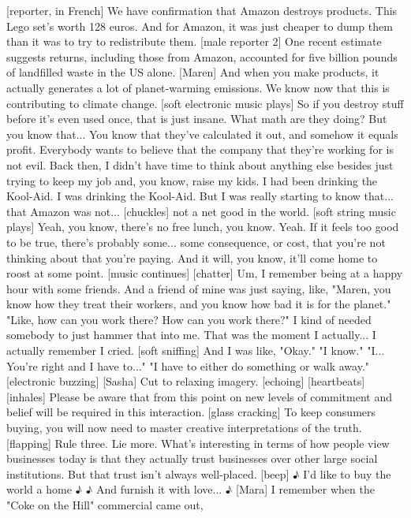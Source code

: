 \documentclass[a4paper]{article}
\begin{document}
	[reporter, in French] We have confirmation that Amazon destroys products.
	This Lego set's worth 128 euros.
	And for Amazon, it was just cheaper to dump them
	than it was to try to redistribute them.
	[male reporter 2] One recent estimate suggests
	returns, including those from Amazon,
	accounted for five billion pounds of landfilled waste in the US alone.
	[Maren] And when you make products,
	it actually generates a lot of planet-warming emissions.
	We know now that this is contributing to climate change.
	[soft electronic music plays]
	So if you destroy stuff before it's even used once,
	that is just insane.
	What math are they doing?
	But you know that... You know that they've calculated it out,
	and somehow it equals profit.
	Everybody wants to believe
	that the company that they're working for is not evil.
	Back then, I didn't have time to think about anything else
	besides just trying to keep my job and, you know, raise my kids.
	I had been drinking the Kool-Aid. I was drinking the Kool-Aid.
	But I was really starting to know that... that Amazon was not... [chuckles]
	not a net good in the world.
	[soft string music plays]
	Yeah, you know, there's no free lunch, you know. Yeah.
	If it feels too good to be true, there's probably some... some consequence,
	or cost, that you're not thinking about that you're paying.
	And it will, you know, it'll come home to roost at some point.
	[music continues]
	[chatter]
	Um, I remember being at a happy hour with some friends.
	And a friend of mine was just saying, like,
	"Maren, you know how they treat their workers,
	and you know how bad it is for the planet."
	"Like, how can you work there? How can you work there?"
	I kind of needed somebody to just hammer that into me.
	That was the moment I actually... I actually remember I cried.
	[soft sniffing]
	And I was like, "Okay."
	"I know."
	"I... You're right and I have to..."
	"I have to either do something or walk away."
	[electronic buzzing]
	[Sasha] Cut to relaxing imagery. [echoing]
	[heartbeats]
	[inhales]
	Please be aware that from this point on
	new levels of commitment and belief will be required in this interaction.
	[glass cracking]
	To keep consumers buying,
	you will now need to master creative interpretations of the truth.
	[flapping]
	Rule three. Lie more.
	What's interesting in terms of how people view businesses today
	is that they actually trust businesses
	over other large social institutions.
	But that trust isn't always well-placed.
	[beep]
	♪ I'd like to buy the world a home ♪
	♪ And furnish it with love... ♪
	[Mara] I remember when the "Coke on the Hill" commercial came out,
\end{document}
